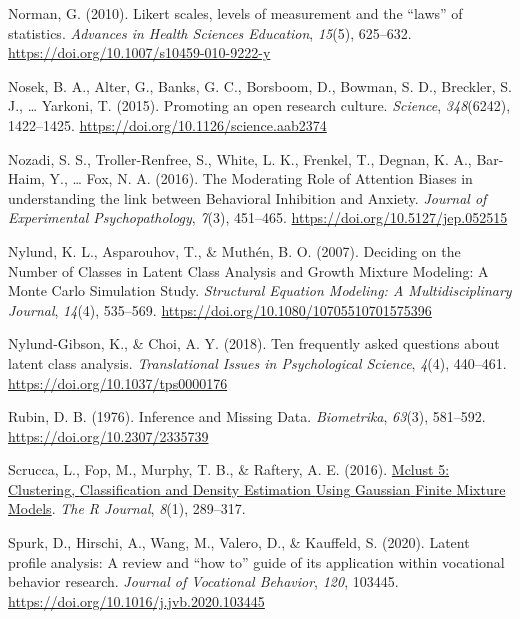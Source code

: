 \documentclass[
  ,man,floatsintext]{apa6}
\newlength{\cslhangindent}
\newlength{\cslentryspacingunit} %
\newenvironment{CSLReferences}[2] %
 {%
  \setlength{\parindent}{0pt}
  \ifodd #1
  \let\oldpar\par
  \def\par{\hangindent=\cslhangindent\oldpar}
  \fi
  \setlength{\parskip}{#2\cslentryspacingunit}
 }%
 {}
\begin{document}
\begin{CSLReferences}{1}{0}
\leavevmode{}%
Norman, G. (2010). Likert scales, levels of measurement and the {``laws''} of statistics. \emph{Advances in Health Sciences Education}, \emph{15}(5), 625--632. \url{https://doi.org/10.1007/s10459-010-9222-y}

\leavevmode{}%
Nosek, B. A., Alter, G., Banks, G. C., Borsboom, D., Bowman, S. D., Breckler, S. J., \ldots{} Yarkoni, T. (2015). Promoting an open research culture. \emph{Science}, \emph{348}(6242), 1422--1425. \url{https://doi.org/10.1126/science.aab2374}

\leavevmode{}%
Nozadi, S. S., Troller-Renfree, S., White, L. K., Frenkel, T., Degnan, K. A., Bar-Haim, Y., \ldots{} Fox, N. A. (2016). The {Moderating} {Role} of {Attention} {Biases} in understanding the link between {Behavioral} {Inhibition} and {Anxiety}. \emph{Journal of Experimental Psychopathology}, \emph{7}(3), 451--465. \url{https://doi.org/10.5127/jep.052515}

\leavevmode{}%
Nylund, K. L., Asparouhov, T., \& Muthén, B. O. (2007). Deciding on the {Number} of {Classes} in {Latent} {Class} {Analysis} and {Growth} {Mixture} {Modeling}: {A} {Monte} {Carlo} {Simulation} {Study}. \emph{Structural Equation Modeling: A Multidisciplinary Journal}, \emph{14}(4), 535--569. \url{https://doi.org/10.1080/10705510701575396}

\leavevmode{}%
Nylund-Gibson, K., \& Choi, A. Y. (2018). Ten frequently asked questions about latent class analysis. \emph{Translational Issues in Psychological Science}, \emph{4}(4), 440--461. \url{https://doi.org/10.1037/tps0000176}

\leavevmode{}%
Rubin, D. B. (1976). Inference and {Missing} {Data}. \emph{Biometrika}, \emph{63}(3), 581--592. \url{https://doi.org/10.2307/2335739}

\leavevmode{}%
Scrucca, L., Fop, M., Murphy, T. B., \& Raftery, A. E. (2016). \href{https://www.ncbi.nlm.nih.gov/pmc/articles/PMC5096736}{Mclust 5: {Clustering}, {Classification} and {Density} {Estimation} {Using} {Gaussian} {Finite} {Mixture} {Models}}. \emph{The R Journal}, \emph{8}(1), 289--317.

\leavevmode{}%
Spurk, D., Hirschi, A., Wang, M., Valero, D., \& Kauffeld, S. (2020). Latent profile analysis: {A} review and {``how to''} guide of its application within vocational behavior research. \emph{Journal of Vocational Behavior}, \emph{120}, 103445. \url{https://doi.org/10.1016/j.jvb.2020.103445}


\end{CSLReferences}
\end{document}
